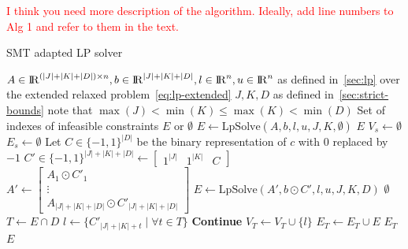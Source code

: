 \documentclass[runningheads]{llncs}
\begin{document}
\textcolor{red}{I think you need more description of the algorithm. Ideally, add line numbers to Alg 1 and refer to them in the text.}
\begin{algorithm}
    \caption{SMT adapted LP solver}\label{alg:theory-solver}
    \begin{algorithmic}[1]
        \Require $A \in {\rm I\!R}^{(|J| + |K| + |D|) \times n}, b \in {\rm I\!R}^{|J| + |K| + |D|}, l \in {\rm I\!R}^n, u \in {\rm I\!R}^n$ \newline
        \qquad as defined in~\autoref{sec:lp} over the extended relaxed problem~\eqref{eq:lp-extended}
        \Require $J, K, D$ as defined in~\autoref{sec:strict-bounds} \newline
        \qquad note that $\max(J) < \min(K) \le \max(K) < \min(D)$
        \Ensure Set of indexes of infeasible constraints $E$ or $\emptyset$
        \State $E \gets \text{LpSolve}(A, b, l, u, J, K, \emptyset)$ 
         \label{alg:theory-solver:infeasible}
        \State \Return $E$
        \EndIf
        \State $V_s \gets \emptyset$
        \State $E_s \gets \emptyset$
        \EndFor
         \label{alg:theory-solver:loop}
        \State Let $C \in \{-1, 1\}^{|D|}$ be the binary representation of $c$ with $0$ replaced by $-1$
        \State $C' \in \{-1, 1\}^{|J|+|K|+|D|} \gets \begin{bmatrix} 1^{|J|} & 1^{|K|} & C\end{bmatrix}$
        \State $A' \gets \begin{bmatrix}A_1 \odot C'_1 \\ \vdots \\ A_{|J|+|K|+|D|} \odot C'_{|J|+|K|+|D|}\end{bmatrix}$
        \State $E \gets \text{LpSolve}(A', b \odot C', l, u, J, K, D)$ \label{alg:theory-solver:loop-solve}
          \label{alg:theory-solver:feasible}
        \State \Return $\emptyset$
        \EndIf
        \State $T \gets E \cap D$ \label{alg:theory-solver:nq-infeasible}
        \State $l \gets \{ C'_{|J| + |K| + t} \mid \forall t \in T\}$ %
         
        \State \textbf{Continue}
        \EndIf
        \State $V_T \gets V_T \cup \{l\}$
        \State $E_T \gets E_T \cup E$ \label{alg:theory-solver:store-explanation}
          \label{alg:theory-solver:relaxed-infeasible}
        \State \Return $E_T$
        \EndIf
        \EndFor
        \State \Return $E$
    \end{algorithmic}
\end{algorithm}
\end{document}
